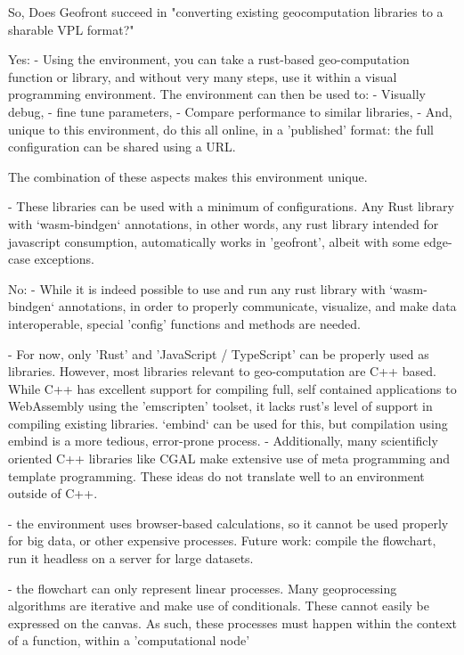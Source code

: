 \begin{note}

  So, Does Geofront succeed in "converting existing geocomputation libraries to a sharable VPL format?" 
  
  Yes: 
   - Using the environment, you can take a rust-based geo-computation function or library, 
     and without very many steps, use it within a visual programming environment. 
     The environment can then be used to:
     - Visually debug, 
     - fine tune parameters, 
     - Compare performance to similar libraries,
     - And, unique to this environment, do this all online, in a 'published' format: the full configuration can be shared using a URL. 
  
     The combination of these aspects makes this environment unique. 
  
  - These libraries can be used with a minimum of configurations. Any Rust library with `wasm-bindgen` annotations, in other words, any rust library intended for javascript consumption, automatically works in 'geofront', albeit with some edge-case exceptions. 
  
  
  No: 
   - While it is indeed possible to use and run any rust library with `wasm-bindgen` annotations, in order to properly communicate, visualize, and make data interoperable, special 'config' functions and methods are needed. 
  
   - For now, only 'Rust' and 'JavaScript / TypeScript' can be properly used as libraries. However, most libraries relevant to geo-computation are C++ based. While C++ has excellent support for compiling full, self contained applications to WebAssembly using the 'emscripten' toolset, it lacks rust's level of support in compiling existing libraries. `embind` can be used for this, but compilation using embind is a more tedious, error-prone process.   
     - Additionally, many scientificly oriented C++ libraries like CGAL make extensive use of meta programming and template programming. These ideas do not translate well to an environment outside of C++. 
  
   - the environment uses browser-based calculations, so it cannot be used properly for big data, or other expensive processes.
     Future work: compile the flowchart, run it headless on a server for large datasets.
   
   - the flowchart can only represent linear processes. Many geoprocessing algorithms are iterative and make use of conditionals. These cannot easily be expressed on the canvas. As such, these processes must happen within the context of a function, within a 'computational node'
  
  \end{note}
  


